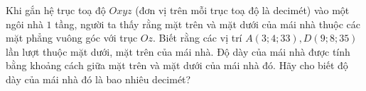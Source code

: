 \begin{bt}%
	Khi gắn hệ trục toạ độ $Oxyz$ (đơn vị trên mỗi trục toạ độ là decimét) vào một ngôi nhà $1$ tầng, người ta thấy rằng mặt trên và mặt dưới của mái nhà thuộc các mặt phẳng vuông góc với trục $Oz$. Biết rằng các vị trí $A(3;4;33), D(9;8;35)$ lần lượt thuộc mặt dưới, mặt trên của mái nhà. Độ dày của mái nhà được tính bằng khoảng cách giữa mặt trên và mặt dưới của mái nhà đó. Hãy cho biết độ dày của mái nhà đó là bao nhiêu decimét?
\end{bt}


